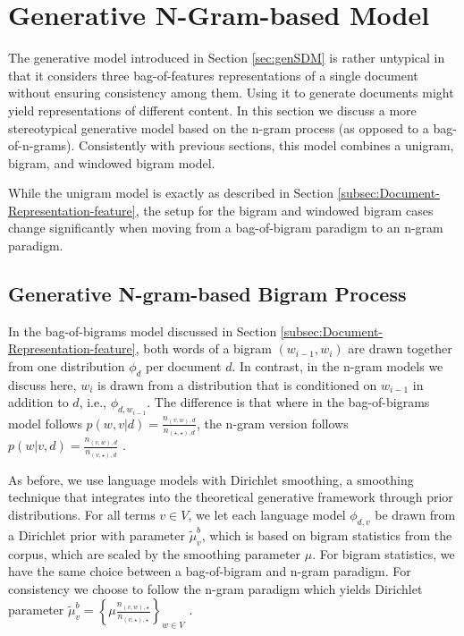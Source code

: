 \documentclass[]{article}
\begin{document}
\section{Generative N-Gram-based Model}

\label{sec:genNgram}The generative model introduced in Section \ref{sec:genSDM}
is rather untypical in that it considers three bag-of-features representations
of a single document without ensuring consistency among them. Using
it to generate documents might yield representations of different
content. In this section we discuss a more stereotypical generative
model based on the n-gram process (as opposed to a bag-of-n-grams).
Consistently with previous sections, this model combines a unigram,
bigram, and windowed bigram model.

While the unigram model is exactly as described in Section \ref{subsec:Document-Representation-feature},
the setup for the bigram and windowed bigram cases change significantly
when moving from a bag-of-bigram paradigm to an n-gram paradigm. 

\subsection{Generative N-gram-based Bigram Process\label{subsec:Generative-n-gram-style-bigram}}

In the bag-of-bigrams model discussed in Section \ref{subsec:Document-Representation-feature},
both words of a bigram $(w_{i-1},w_{i})$ are drawn together from
one distribution $\phi_{d}$ per document $d$. In contrast, in the
n-gram models we discuss here, $w_{i}$ is drawn from a distribution
that is conditioned on $w_{i-1}$ in addition to $d$, i.e., $\phi_{d,w_{i-1}}$.
The difference is that where in the bag-of-bigrams model follows $p(w,v|d)=\frac{n_{(v,w),d}}{n_{(\star,\star),d}}$,
the n-gram version follows $p(w|v,d)=\frac{n_{(v,w),d}}{n_{(v,\star),d}}$
.

As before, we use language models with Dirichlet smoothing, a smoothing
technique that integrates into the theoretical generative framework
through prior distributions. For all terms $v\in V$, we let each
language model $\phi_{d,v}$ be drawn from a Dirichlet prior with
parameter $\tilde{\mu}_{v}^{b}$, which is based on bigram statistics
from the corpus, which are scaled by the smoothing parameter $\mu$.
For bigram statistics, we have the same choice between a bag-of-bigram
and n-gram paradigm. For consistency we choose to follow the n-gram
paradigm which yields Dirichlet parameter $\tilde{\mu}_{v}^{b}=\left\{ \mu\frac{n_{(v,w),\star}}{n_{(v,\star),\star}}\right\} _{w\in V}$
.
\end{document}
